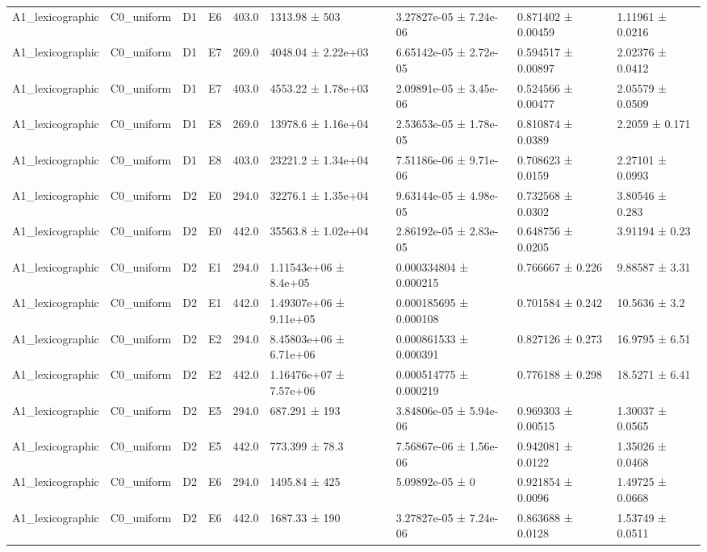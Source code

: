 \begin{table}
\begin{tabular}{lllllllll}
A1\_lexicographic & C0\_uniform & D1 & E6 & 403.0 & 1313.98 ± 503 & 3.27827e-05 ± 7.24e-06 & 0.871402 ± 0.00459 & 1.11961 ± 0.0216 \\
A1\_lexicographic & C0\_uniform & D1 & E7 & 269.0 & 4048.04 ± 2.22e+03 & 6.65142e-05 ± 2.72e-05 & 0.594517 ± 0.00897 & 2.02376 ± 0.0412 \\
A1\_lexicographic & C0\_uniform & D1 & E7 & 403.0 & 4553.22 ± 1.78e+03 & 2.09891e-05 ± 3.45e-06 & 0.524566 ± 0.00477 & 2.05579 ± 0.0509 \\
A1\_lexicographic & C0\_uniform & D1 & E8 & 269.0 & 13978.6 ± 1.16e+04 & 2.53653e-05 ± 1.78e-05 & 0.810874 ± 0.0389 & 2.2059 ± 0.171 \\
A1\_lexicographic & C0\_uniform & D1 & E8 & 403.0 & 23221.2 ± 1.34e+04 & 7.51186e-06 ± 9.71e-06 & 0.708623 ± 0.0159 & 2.27101 ± 0.0993 \\
A1\_lexicographic & C0\_uniform & D2 & E0 & 294.0 & 32276.1 ± 1.35e+04 & 9.63144e-05 ± 4.98e-05 & 0.732568 ± 0.0302 & 3.80546 ± 0.283 \\
A1\_lexicographic & C0\_uniform & D2 & E0 & 442.0 & 35563.8 ± 1.02e+04 & 2.86192e-05 ± 2.83e-05 & 0.648756 ± 0.0205 & 3.91194 ± 0.23 \\
A1\_lexicographic & C0\_uniform & D2 & E1 & 294.0 & 1.11543e+06 ± 8.4e+05 & 0.000334804 ± 0.000215 & 0.766667 ± 0.226 & 9.88587 ± 3.31 \\
A1\_lexicographic & C0\_uniform & D2 & E1 & 442.0 & 1.49307e+06 ± 9.11e+05 & 0.000185695 ± 0.000108 & 0.701584 ± 0.242 & 10.5636 ± 3.2 \\
A1\_lexicographic & C0\_uniform & D2 & E2 & 294.0 & 8.45803e+06 ± 6.71e+06 & 0.000861533 ± 0.000391 & 0.827126 ± 0.273 & 16.9795 ± 6.51 \\
A1\_lexicographic & C0\_uniform & D2 & E2 & 442.0 & 1.16476e+07 ± 7.57e+06 & 0.000514775 ± 0.000219 & 0.776188 ± 0.298 & 18.5271 ± 6.41 \\
A1\_lexicographic & C0\_uniform & D2 & E5 & 294.0 & 687.291 ± 193 & 3.84806e-05 ± 5.94e-06 & 0.969303 ± 0.00515 & 1.30037 ± 0.0565 \\
A1\_lexicographic & C0\_uniform & D2 & E5 & 442.0 & 773.399 ± 78.3 & 7.56867e-06 ± 1.56e-06 & 0.942081 ± 0.0122 & 1.35026 ± 0.0468 \\
A1\_lexicographic & C0\_uniform & D2 & E6 & 294.0 & 1495.84 ± 425 & 5.09892e-05 ± 0 & 0.921854 ± 0.0096 & 1.49725 ± 0.0668 \\
A1\_lexicographic & C0\_uniform & D2 & E6 & 442.0 & 1687.33 ± 190 & 3.27827e-05 ± 7.24e-06 & 0.863688 ± 0.0128 & 1.53749 ± 0.0511 \\

\end{tabular}
\end{table}

